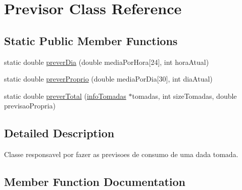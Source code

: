 \hypertarget{class_previsor}{}\section{Previsor Class Reference}
\label{class_previsor}
\subsection*{Static Public Member Functions}
\begin{DoxyCompactItemize}
\item 
static double \hyperlink{class_previsor_a48823838f0274c4790e2333d552a2424}{prever\+Dia} (double media\+Por\+Hora\mbox{[}24\mbox{]}, int hora\+Atual)
\item 
static double \hyperlink{class_previsor_a10cdf169e213d6f0f49dc1ee0fe50e91}{prever\+Proprio} (double media\+Por\+Dia\mbox{[}30\mbox{]}, int dia\+Atual)
\item 
static double \hyperlink{class_previsor_a42c4d66252f09dc4b2af91b500f5e38b}{prever\+Total} (\hyperlink{structinfo_tomadas}{info\+Tomadas} $\ast$tomadas, int size\+Tomadas, double previsao\+Propria)
\end{DoxyCompactItemize}


\subsection{Detailed Description}
Classe responsavel por fazer as previsoes de consumo de uma dada tomada. 

\subsection{Member Function Documentation}
